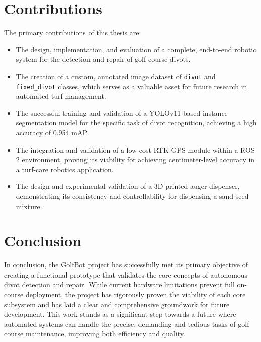 \section{Contributions}
The primary contributions of this thesis are:
\begin{itemize}
    \item The design, implementation, and evaluation of a complete, end-to-end robotic system for the detection and repair of golf course divots.
    \item The creation of a custom, annotated image dataset of \texttt{divot} and \texttt{fixed\_divot} classes, which serves as a valuable asset for future research in automated turf management.
    \item The successful training and validation of a YOLOv11-based instance segmentation model for the specific task of divot recognition, achieving a high accuracy of 0.954 mAP.
    \item The integration and validation of a low-cost RTK-GPS module within a ROS 2 environment, proving its viability for achieving centimeter-level accuracy in a turf-care robotics application.
    \item The design and experimental validation of a 3D-printed auger dispenser, demonstrating its consistency and controllability for dispensing a sand-seed mixture.
\end{itemize}

\section{Conclusion}
In conclusion, the GolfBot project has successfully met its primary objective of creating a functional prototype that validates the core concepts of autonomous divot detection and repair. While current hardware limitations prevent full on-course deployment, the project has rigorously proven the viability of each core subsystem and has laid a clear and comprehensive groundwork for future development. This work stands as a significant step towards a future where automated systems can handle the precise, demanding and tedious tasks of golf course maintenance, improving both efficiency and quality.
